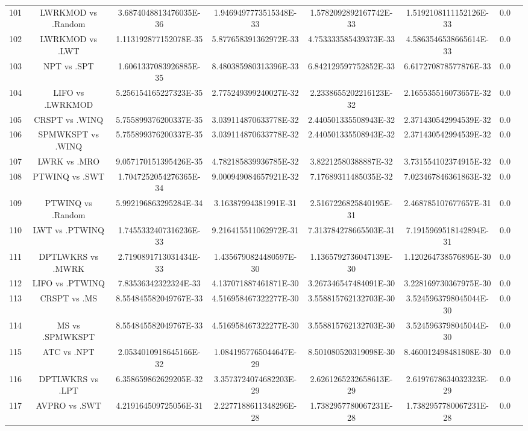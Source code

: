 \documentclass[a3paper,10pt]{article}
\begin{document}
\begin{table}[!htp]
\begin{tabular}{cccccccc}
101&LWRKMOD vs .Random&3.6874048813476035E-36&1.9469497773515348E-33&1.5782092892167742E-33&1.5192108111152126E-33&0.0\\
102&LWRKMOD vs .LWT&1.113192877152078E-35&5.877658391362972E-33&4.753333585439373E-33&4.5863546538665614E-33&0.0\\
103&NPT vs .SPT&1.6061337083926885E-35&8.480385980313396E-33&6.842129597752852E-33&6.617270878577876E-33&0.0\\
104&LIFO vs .LWRKMOD&5.256154165227323E-35&2.775249399240027E-32&2.2338655202216123E-32&2.165535516073657E-32&0.0\\
105&CRSPT vs .WINQ&5.755899376200337E-35&3.039114870633778E-32&2.440501335508943E-32&2.371430542994539E-32&0.0\\
106&SPMWKSPT vs .WINQ&5.755899376200337E-35&3.039114870633778E-32&2.440501335508943E-32&2.371430542994539E-32&0.0\\
107&LWRK vs .MRO&9.057170151395426E-35&4.782185839936785E-32&3.82212580388887E-32&3.731554102374915E-32&0.0\\
108&PTWINQ vs .SWT&1.7047252054276365E-34&9.000949084657921E-32&7.17689311485035E-32&7.023467846361863E-32&0.0\\
109&PTWINQ vs .Random&5.992196863295284E-34&3.16387994381991E-31&2.5167226825840195E-31&2.468785107677657E-31&0.0\\
110&LWT vs .PTWINQ&1.7455332407316236E-33&9.216415511062972E-31&7.313784278665503E-31&7.1915969518142894E-31&0.0\\
111&DPTLWKRS vs .MWRK&2.7190891713031434E-33&1.4356790824480597E-30&1.1365792736047139E-30&1.120264738576895E-30&0.0\\
112&LIFO vs .PTWINQ&7.83536342322324E-33&4.137071887461871E-30&3.267346547484091E-30&3.228169730367975E-30&0.0\\
113&CRSPT vs .MS&8.554845582049767E-33&4.516958467322277E-30&3.558815762132703E-30&3.5245963798045044E-30&0.0\\
114&MS vs .SPMWKSPT&8.554845582049767E-33&4.516958467322277E-30&3.558815762132703E-30&3.5245963798045044E-30&0.0\\
115&ATC vs .NPT&2.0534010918645166E-32&1.0841957765044647E-29&8.501080520319098E-30&8.460012498481808E-30&0.0\\
116&DPTLWKRS vs .LPT&6.358659862629205E-32&3.3573724074682203E-29&2.6261265232658613E-29&2.6197678634032323E-29&0.0\\
117&AVPRO vs .SWT&4.219164509725056E-31&2.2277188611348296E-28&1.7382957780067231E-28&1.7382957780067231E-28&0.0\\

\end{tabular}
\end{table}
\end{document}
